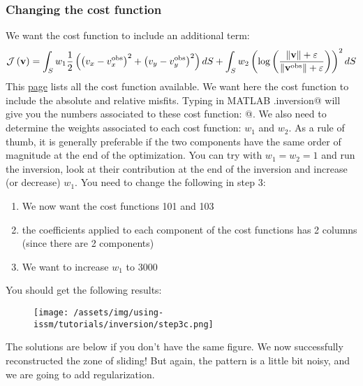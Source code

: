 \subsubsection{Changing the cost function}
We want the cost function to include an additional term:
\begin{equation}
	{\mathcal J\left({\bf v}\right)}
	=\int_{S} w_1 \dfrac{1}{2}\left(
	\left(v_x-v_x^{\text{obs}}\right)^{2}
	+\left(v_y-v_y^{\text{obs}}\right)^{2}
	\right) dS
	+\int_{S} w_2 \left(\text{log}\left(
	\dfrac{\|{\bf v}\|+\varepsilon}{\|{\bf v}^{\text{obs}}\|+\varepsilon}
	\right) \right)^2 dS
\end{equation}
This \href{http://issm.jpl.nasa.gov/documentation/inversions/}{page} lists all the cost function available. We want here the cost function to include the absolute and relative misfits. Typing in MATLAB \verb@md.inversion@ will give you the numbers associated to these cost function: \verb@[101,103]@. We also need to determine the weights associated to each cost function: $w_1$ and $w_2$. As a rule of thumb, it is generally preferable if the two components have the same order of magnitude at the end of the optimization. You can try with $w_1=w_2=1$ and run the inversion, look at their contribution at the end of the inversion and increase (or decrease) $w_1$. You need to change the following in step 3:
\begin{enumerate}
	\item We now want the cost functions 101 and 103
	\item the coefficients applied to each component of the cost functions has 2 columns (since there are 2 components)
	\item We want to increase $w_1$ to 3000
\end{enumerate}
You should get the following results:
\begin{figure}[H]
	\begin{center}
		\texttt{[image: /assets/img/using-issm/tutorials/inversion/step3c.png]}
	\end{center}
\end{figure}
The solutions are below if you don't have the same figure. We now successfully reconstructed the zone of sliding! But again, the pattern is a little bit noisy, and we are going to add regularization.

